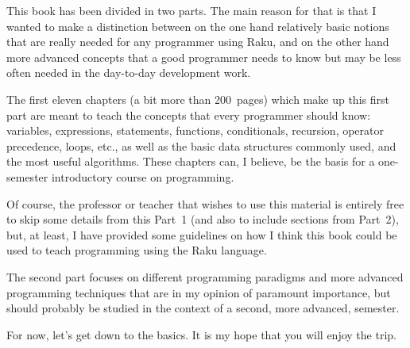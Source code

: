 %

This book has been divided in two parts. The main reason for that
is that I wanted to make a distinction between on the one hand 
relatively basic notions that are really needed for any programmer 
using Raku, and on the other hand more advanced concepts that 
a good programmer needs to know but may be less often needed in 
the day-to-day development work.

The first eleven chapters (a bit more than 200~pages) which make up 
this first part are meant to teach the concepts that every 
programmer should know: variables, expressions, statements, 
functions, conditionals, recursion, operator precedence, loops, etc., 
as well as the basic data structures commonly used, and the most 
useful algorithms.  These chapters can, I believe, be the basis 
for a one-semester introductory course on programming. 

Of course, the professor or teacher that wishes to use this 
material is entirely free to skip some details from this 
Part~1 (and also to include sections from Part~2), but, at 
least, I have provided some guidelines on how I think this 
book could be used to teach programming using the Raku language.

The second part focuses on different programming paradigms and 
more advanced programming techniques that are in my opinion of 
paramount importance, but should probably be studied in the context
of a second, more advanced, semester.

For now, let's get down to the basics. It is my hope that you 
will enjoy the trip.

